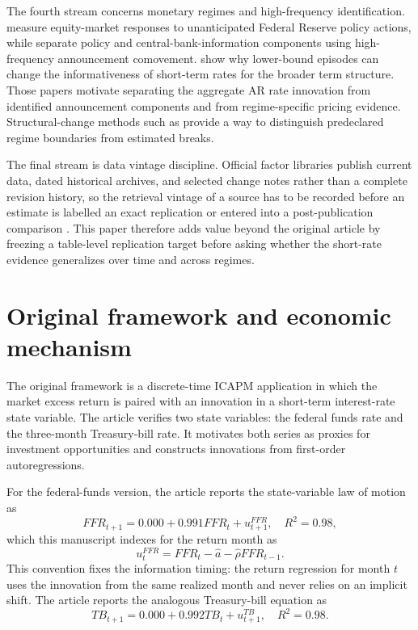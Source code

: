\documentclass[11pt]{article}
\begin{document}
The fourth stream concerns monetary regimes and high-frequency identification.
\citet{bernanke_kuttner_2005} measure equity-market responses to unanticipated
Federal Reserve policy actions, while \citet{jarocinski_karadi_2020} separate
policy and central-bank-information components using high-frequency
announcement comovement. \citet{swanson_williams_2014} show why lower-bound
episodes can change the informativeness of short-term rates for the broader term
structure. Those papers motivate separating the aggregate AR rate innovation from
identified announcement components and from regime-specific pricing evidence.
Structural-change methods such as \citet{bai_perron_1998} provide a way to
distinguish predeclared regime boundaries from estimated breaks.

The final stream is data vintage discipline. Official factor libraries publish
current data, dated historical archives, and selected change notes rather than a
complete revision history, so the retrieval vintage of a source has to be
recorded before an estimate is labelled an exact replication or entered into a
post-publication comparison
\citep{fama_french_data_library_2026}. This paper therefore adds value beyond
the original article by freezing a table-level replication target before asking
whether the short-rate evidence generalizes over time and across regimes.

\section{Original framework and economic mechanism}

The original framework is a discrete-time ICAPM application in which the market
excess return is paired with an innovation in a short-term interest-rate state
variable. The article verifies two state variables: the federal funds rate and the
three-month Treasury-bill rate. %
It motivates both series as proxies for investment opportunities and constructs
innovations from first-order autoregressions. %

For the federal-funds version, the article reports the state-variable law of
motion as
\[
FFR_{t+1}=0.000+0.991FFR_t+u^{FFR}_{t+1}, \quad R^2=0.98, %
\]
which this manuscript indexes for the return month as
\[
u^{FFR}_t=FFR_t-\hat a-\hat\rho FFR_{t-1}. %
\]
This convention fixes the information timing: the return regression for month
\(t\) uses the innovation from the same realized month and never relies on an
implicit shift. The article reports the analogous Treasury-bill equation as
\[
TB_{t+1}=0.000+0.992TB_t+u^{TB}_{t+1}, \quad R^2=0.98. %
\]
\end{document}
